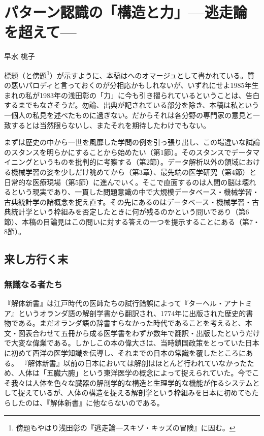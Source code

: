 
\chapter{パターン認識の「構造と力」---逃走論を超えて---}

\begin{flushright}
 {\headfont 早水 桃子}%
\end{flushright}

\begin{spacing}{0.6}
\footnotesize{
\noindent
標題（と傍題\footnote{傍題もやはり浅田彰の『逃走論---スキゾ・キッズの冒険』に因む。}）が示すように、本稿はへのオマージュとして書かれている。質の悪いパロディと言っておくのが分相応かもしれないが、いずれにせよ1985年生まれの私が1983年の浅田彰の「力」に今も引き摺られているということは、告白するまでもなさそうだ。勿論、出典が記されている部分を除き、本稿は私という一個人の私見を述べたものに過ぎない。だからそれは各分野の専門家の意見と一致するとは当然限らないし、またそれを期待したわけでもない。

\noindent
まずは歴史の中から一世を風靡した学問の例を引っ張り出し、この場違いな試論のスタンスを明らかにすることから始めたい（第1節）。そのスタンスでデータマイニングというものを批判的に考察する（第2節）。データ解析以外の領域における機械学習の姿を少しだけ眺めてから（第3章）、最先端の医学研究（第4節）と日常的な医療現場（第5節）に進んでいく。そこで直面するのは人間の脳は壊れるという現実であり、一貫した問題意識の中で大規模データベース・機械学習・古典統計学の諸概念を捉え直す。その先にあるのはデータベース・機械学習・古典統計学という枠組みを否定したときに何が残るのかという問いであり（第6節）、本稿の目論見はこの問いに対する答えの一つを提示することにある（第7・8節）。
}
\end{spacing}
 
\section{来し方行く末}
\subsection{無識なる者たち}
『解体新書』は江戸時代の医師たちの試行錯誤によって『ターヘル・アナトミア』というオランダ語の解剖学書から翻訳され、1774年に出版された歴史的書物である。まだオランダ語の辞書すらなかった時代であることを考えると、本文・図表合わせて五冊から成る医学書をわずか数年で翻訳・出版したというだけで大変な偉業である。しかしこの本の偉大さは、当時鎖国政策をとっていた日本に初めて西洋の医学知識を伝導し、それまでの日本の常識を覆したところにある。
『解体新書』以前の日本においては解剖はほとんど行われていなかったため、人体は「五臓六腑」という東洋医学の概念によって捉えられていた。今でこそ我々は人体を色々な臓器の解剖学的な構造と生理学的な機能が作るシステムとして捉えているが、人体の構造を捉える解剖学という枠組みを日本に初めてもたらしたのは、『解体新書』に他ならないのである。


